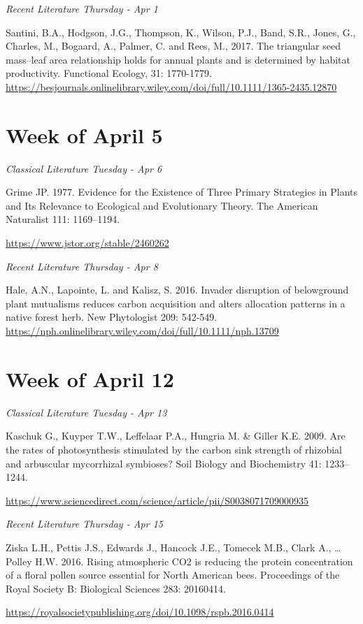 \documentclass[12pt, notitlepage]{article}   	%
\begin{document}
{\textit{Recent Literature Thursday - Apr 1} \par
Santini, B.A., Hodgson, J.G., Thompson, K., Wilson, P.J., Band, S.R., Jones, G., 
Charles, M., Bogaard, A., Palmer, C. and Rees, M., 2017. 
The triangular seed mass–leaf area relationship holds for annual plants and is determined by habitat productivity. 
Functional Ecology, 31: 1770-1779.
\url{https://besjournals.onlinelibrary.wiley.com/doi/full/10.1111/1365-2435.12870}

\section*{Week of April 5}
\textit{Classical Literature Tuesday - Apr 6} \par
Grime JP. 1977. Evidence for the Existence of Three Primary Strategies in Plants and Its 
Relevance to Ecological and Evolutionary Theory. 
The American Naturalist 111: 1169–1194. \par
\url{https://www.jstor.org/stable/2460262}

\textit{Recent Literature Thursday - Apr 8} \par
Hale, A.N., Lapointe, L. and Kalisz, S. 2016. 
Invader disruption of belowground plant mutualisms reduces carbon acquisition and 
alters allocation patterns in a native forest herb. New Phytologist 209: 542-549.
\url{https://nph.onlinelibrary.wiley.com/doi/full/10.1111/nph.13709}

\section*{Week of April 12}
\textit{Classical Literature Tuesday - Apr 13} \par
Kaschuk G., Kuyper T.W., Leffelaar P.A., Hungria M. & Giller K.E. 2009.
Are the rates of photosynthesis stimulated by the carbon sink strength of 
rhizobial and arbuscular mycorrhizal symbioses? Soil Biology and Biochemistry 41: 1233–1244. \par
\url{https://www.sciencedirect.com/science/article/pii/S0038071709000935}

\textit{Recent Literature Thursday - Apr 15} \par
Ziska L.H., Pettis J.S., Edwards J., Hancock J.E., Tomecek M.B., Clark A., … Polley H.W. 2016. 
Rising atmospheric CO2 is reducing the protein concentration of a floral pollen source essential for North American bees. 
Proceedings of the Royal Society B: Biological Sciences 283: 20160414. \par
\url{https://royalsocietypublishing.org/doi/10.1098/rspb.2016.0414}

}
\end{document}
